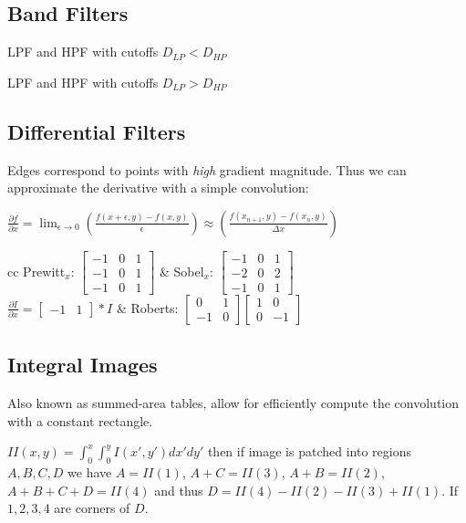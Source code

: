 \subsection{Band Filters}

\begin{definition}
  LPF and HPF with cutoffs \(D_{LP} < D_{HP}\)
\end{definition}

\begin{definition}
  LPF and HPF with cutoffs \(D_{LP} > D_{HP}\)
\end{definition}

\subsection{Differential Filters}
Edges correspond to points with \textit{high} gradient magnitude. Thus we can approximate the derivative with a simple convolution:
\begin{center}
  \(\frac{\partial f}{\partial x} = \lim_{\epsilon \to 0}\left(\frac{f(x + \epsilon, y) - f(x, y)}{\epsilon}\right) \approx \left(\frac{f(x_{n+1}, y) - f(x_n, y)}{\varDelta x}\right)\)
\end{center}

\begin{tabularx}{\linewidth}{cc}
  Prewitt\(_x\): \(\begin{bmatrix}
    -1 & 0 & 1 \\
    -1 & 0 & 1 \\
    -1 & 0 & 1
  \end{bmatrix}\) & 
  Sobel\(_x\): \(\begin{bmatrix}
    -1 & 0 & 1 \\
    -2 & 0 & 2 \\
    -1 & 0 & 1
  \end{bmatrix}\) \\
  \(\frac{\partial I}{\partial x} = \begin{bmatrix}
    -1 & 1
  \end{bmatrix} \ast I\) &
  Roberts: \(\begin{bmatrix}
    0 & 1 \\
    -1 & 0
  \end{bmatrix} \begin{bmatrix}
    1 & 0 \\
    0 & -1
  \end{bmatrix}\)
\end{tabularx}

\subsection{Integral Images}
Also known as summed-area tables, allow for efficiently compute the convolution with a constant rectangle.

\(II(x, y) = \int_0^x \int_0^y I(x', y') dx' dy'\) then if image is patched into regions \(A, B, C, D\) we have \(A = II(1)\), \(A + C = II(3)\), \(A + B = II(2)\), \(A + B + C + D = II(4)\) and thus \(D = II(4) - II(2) - II(3) + II(1)\). If \(1, 2, 3, 4\) are corners of \(D\).
